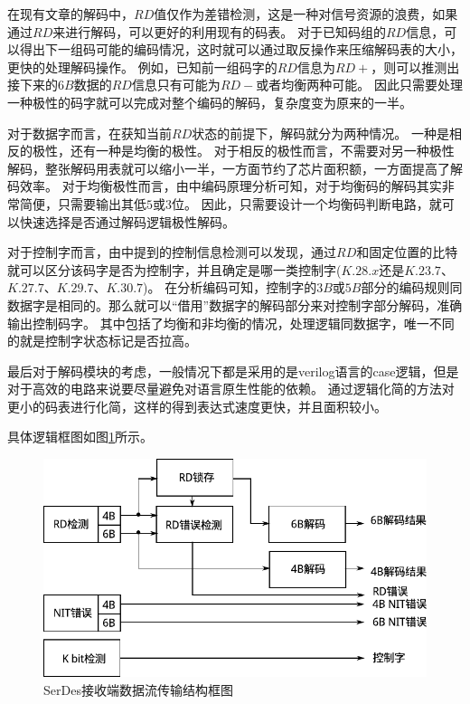 \documentclass[UTF8]{ctexart}
\begin{document}
在现有文章的解码中，$RD$值仅作为差错检测，这是一种对信号资源的浪费，如果通过$RD$来进行解码，可以更好的利用现有的码表。
对于已知码组的$RD$信息，可以得出下一组码可能的编码情况，这时就可以通过取反操作来压缩解码表的大小，更快的处理解码操作。
例如，已知前一组码字的$RD$信息为$RD+$，则可以推测出接下来的$6B$数据的$RD$信息只有可能为$RD-$或者均衡两种可能。
因此只需要处理一种极性的码字就可以完成对整个编码的解码，复杂度变为原来的一半。

对于数据字而言，在获知当前$RD$状态的前提下，解码就分为两种情况。
一种是相反的极性，还有一种是均衡的极性。
对于相反的极性而言，不需要对另一种极性解码，整张解码用表就可以缩小一半，一方面节约了芯片面积额，一方面提高了解码效率。
对于均衡极性而言，由\cite{Widmer1983}中编码原理分析可知，对于均衡码的解码其实非常简便，只需要输出其低$5$或$3$位。
因此，只需要设计一个均衡码判断电路，就可以快速选择是否通过解码逻辑极性解码。

对于控制字而言，由\cite{Actel1998}中提到的控制信息检测可以发现，通过$RD$和固定位置的比特就可以区分该码字是否为控制字，并且确定是哪一类控制字($K.28.x$还是$K.23.7$、$K.27.7$、$K.29.7$、$K.30.7$)。
在分析编码可知，控制字的$3B$或$5B$部分的编码规则同数据字是相同的。那么就可以“借用”数据字的解码部分来对控制字部分解码，准确输出控制码字。
其中包括了均衡和非均衡的情况，处理逻辑同数据字，唯一不同的就是控制字状态标记是否拉高。

最后对于解码模块的考虑，一般情况下都是采用的是verilog语言的case逻辑，但是对于高效的电路来说要尽量避免对语言原生性能的依赖。
通过逻辑化简的方法对更小的码表进行化简，这样的得到表达式速度更快，并且面积较小。

具体逻辑框图如图\ref{fig:8b10b_decoder_diagram}所示。

\begin{figure}[H]
\centering
\includegraphics[width=14cm]{./img/8b10b_decoder_diagram.pdf}
\caption{SerDes接收端数据流传输结构框图}
\label{fig:8b10b_decoder_diagram}
\end{figure}
\end{document}
